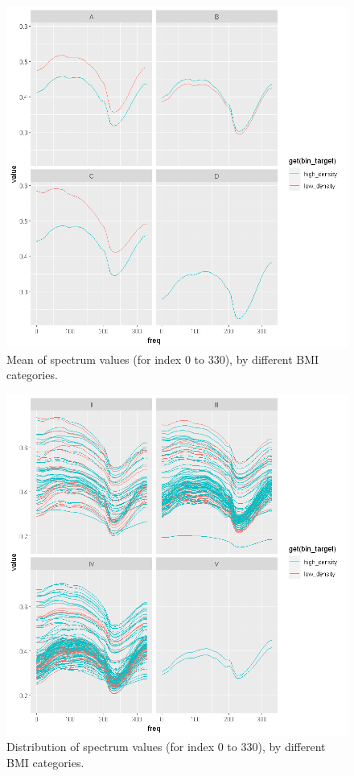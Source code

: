 \documentclass[letterpaper,11pt]{article}
\begin{document}
\begin{figure}[!htb]
	\centering
	\includegraphics[trim={0 0cm 0cm 0}, clip, scale=0.55]{figures/scio_by_copa_mean.png}
	\caption{Mean of spectrum values (for index 0 to 330), by different BMI categories.} 
	\label{fig:scio_copa_mean}
\end{figure}

\begin{figure}[!htb]
	\centering
	\includegraphics[trim={0 0cm 0cm 0}, clip, scale=0.55]{figures/scio_by_color.png}
	\caption{Distribution of spectrum values (for index 0 to 330), by different BMI categories.} 
	\label{fig:scio_color}
\end{figure}
\end{document}

